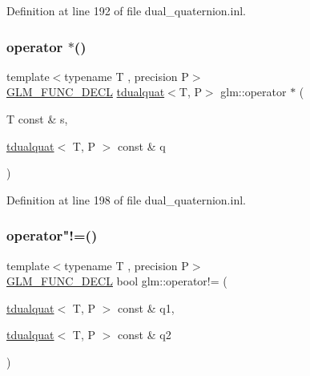 Definition at line 192 of file dual\+\_\+quaternion.\+inl.

\mbox{\label{group__gtx__dual__quaternion_ga95c5286c40784455b0130b2880e99f72}} 
\subsubsection{\texorpdfstring{operator $\ast$()}{operator *()}\hspace{0.1cm}{\footnotesize\ttfamily [7/7]}}
{\footnotesize\ttfamily template$<$typename T , precision P$>$ \\
\mbox{\hyperlink{setup_8hpp_ab2d052de21a70539923e9bcbf6e83a51}{G\+L\+M\+\_\+\+F\+U\+N\+C\+\_\+\+D\+E\+CL}} \mbox{\hyperlink{structglm_1_1tdualquat}{tdualquat}}$<$T, P$>$ glm\+::operator $\ast$ (\begin{DoxyParamCaption}\item[{T const \&}]{s,  }\item[{\mbox{\hyperlink{structglm_1_1tdualquat}{tdualquat}}$<$ T, P $>$ const \&}]{q }\end{DoxyParamCaption})}



Definition at line 198 of file dual\+\_\+quaternion.\+inl.

\mbox{\label{group__gtx__dual__quaternion_ga5d256fb73497154924e2cf772411edef}} 
\subsubsection{\texorpdfstring{operator"!=()}{operator!=()}}
{\footnotesize\ttfamily template$<$typename T , precision P$>$ \\
\mbox{\hyperlink{setup_8hpp_ab2d052de21a70539923e9bcbf6e83a51}{G\+L\+M\+\_\+\+F\+U\+N\+C\+\_\+\+D\+E\+CL}} bool glm\+::operator!= (\begin{DoxyParamCaption}\item[{\mbox{\hyperlink{structglm_1_1tdualquat}{tdualquat}}$<$ T, P $>$ const \&}]{q1,  }\item[{\mbox{\hyperlink{structglm_1_1tdualquat}{tdualquat}}$<$ T, P $>$ const \&}]{q2 }\end{DoxyParamCaption})}



